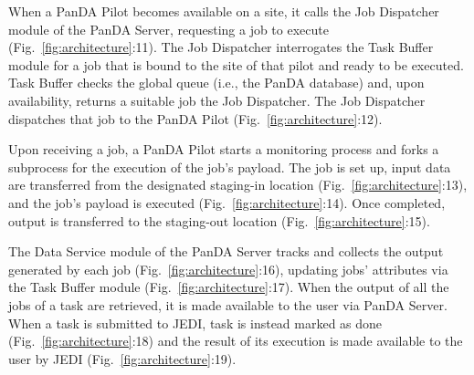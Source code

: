 
When a PanDA Pilot becomes available on a site, it calls the Job Dispatcher
module of the PanDA Server, requesting  a job to execute
(Fig.~\ref{fig:architecture}:11). The Job Dispatcher interrogates the Task
Buffer module for a job that is bound to the site of that pilot and ready to be
executed. Task Buffer checks the global queue (i.e., the PanDA database) and,
upon availability, returns a suitable job the Job Dispatcher.  The Job Dispatcher
dispatches that job to the PanDA Pilot (Fig.~\ref{fig:architecture}:12).


Upon receiving a job, a PanDA Pilot starts a monitoring process and forks a
subprocess for the execution of the job's payload. The job is set up, input data
are transferred from the designated staging-in location
(Fig.~\ref{fig:architecture}:13), and the job's payload is executed
(Fig.~\ref{fig:architecture}:14). Once completed, output is transferred to the
staging-out location (Fig.~\ref{fig:architecture}:15).


The Data Service module of the PanDA Server tracks and collects the output
generated by each job (Fig.~\ref{fig:architecture}:16), updating jobs'
attributes via the Task Buffer module (Fig.~\ref{fig:architecture}:17). When the
output of all the jobs of a task are retrieved, it is made available to the user
via PanDA Server. When a task is submitted to JEDI, task is instead marked as
done (Fig.~\ref{fig:architecture}:18) and the result of its execution is made
available to the user by JEDI (Fig.~\ref{fig:architecture}:19).


